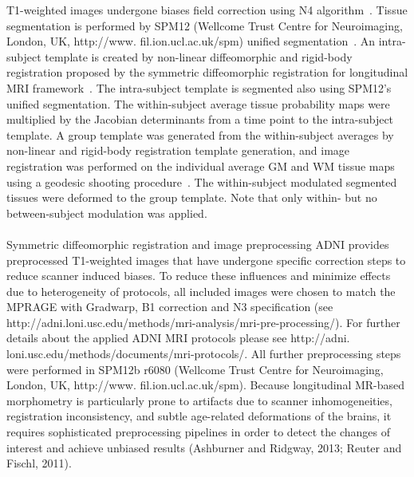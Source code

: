 \documentclass[final, paper=letter,5p,times,twocolumn]{elsarticle}
\theoremstyle{definition}
\begin{document}
T1-weighted images undergone biases field correction using N4 algorithm~\cite{pmid20378467}. Tissue segmentation is performed by SPM12 (Wellcome Trust Centre for Neuroimaging, London, UK, http://www. fil.ion.ucl.ac.uk/spm) unified segmentation~\cite{pmid15955494}. An intra-subject template is created by non-linear diffeomorphic and rigid-body registration proposed by the symmetric diffeomorphic registration for longitudinal MRI framework~\cite{pmid23386806}. The intra-subject template is segmented also using SPM12's unified segmentation. The within-subject average tissue probability maps were multiplied by the Jacobian determinants from a time point to the intra-subject template. A group template was generated from the within-subject averages by non-linear and rigid-body registration template generation, and image registration was performed on the individual average GM and WM tissue maps using a geodesic shooting procedure~\cite{pmid21216294}. The within-subject modulated segmented tissues were deformed to the group template. Note that only within- but no between-subject modulation was applied. \\ \\
Symmetric diffeomorphic registration and image preprocessing ADNI provides preprocessed T1-weighted images that have undergone specific correction steps to reduce scanner induced biases. To reduce these influences and minimize effects due to heterogeneity of protocols, all included images were chosen to match the MPRAGE with Gradwarp, B1 correction and N3 specification (see http://adni.loni.usc.edu/methods/mri-analysis/mri-pre-processing/). For further details about the applied ADNI MRI protocols please see http://adni. loni.usc.edu/methods/documents/mri-protocols/. All further preprocessing steps were performed in SPM12b r6080 (Wellcome Trust Centre for Neuroimaging, London, UK, http://www. fil.ion.ucl.ac.uk/spm). Because longitudinal MR-based morphometry is particularly prone to artifacts due to scanner inhomogeneities, registration inconsistency, and subtle age-related deformations of the brains, it requires sophisticated preprocessing pipelines in order to detect the changes of interest and achieve unbiased results (Ashburner and Ridgway, 2013; Reuter and Fischl, 2011). \\
\end{document}
